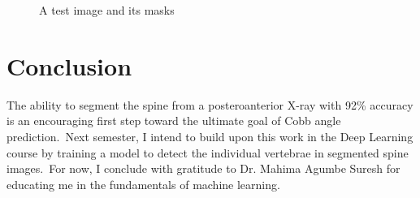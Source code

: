 \documentclass[conference]{IEEEtran}
\begin{document}
    \begin{figure}
        \caption{A test image and its masks}
        \label{fig:results5}
        \centering
    \end{figure}

    \section{Conclusion}\label{sec:conclusion}

    The ability to segment the spine from a posteroanterior X-ray with 92\% accuracy is an encouraging first step toward the ultimate goal of Cobb angle prediction.\ Next semester, I intend to build upon this work in the Deep Learning course by training a model to detect the individual vertebrae in segmented spine images.\ For now, I conclude with gratitude to Dr. Mahima Agumbe Suresh for educating me in the fundamentals of machine learning.

    
    
\end{document}
